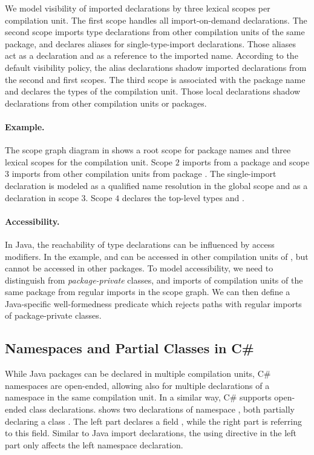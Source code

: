 We model visibility of imported declarations by three lexical scopes per compilation unit.
The first scope handles all import-on-demand declarations.
The second scope 
  imports type declarations from other compilation units of the same package,
  and declares aliases for single-type-import declarations.
Those aliases act as a declaration and as a reference to the imported name.
According to the default visibility policy, 
  the alias declarations shadow imported declarations from the second and first scopes.
The third scope is associated with the package name and 
  declares the types of the compilation unit.
Those local declarations shadow declarations from other compilation units or packages.

\paragraph{Example.}

The scope graph diagram in  shows 
  a root scope for package names and three lexical scopes for the compilation unit.
Scope $2$ imports from a package 
  and scope $3$ imports from other compilation units from package .
The single-import declaration  is modeled as a qualified name resolution in the global scope
  and as a declaration in scope $3$.
Scope $4$ declares the top-level types  and .

\paragraph{Accessibility.}

In Java, the reachability of type declarations can be influenced by access modifiers.
In the example,  and  can be accessed in other compilation units of ,
  but  cannot be accessed in other packages.
To model accessibility, we need to distinguish 
    from \emph{package-private} classes, and
  imports of compilation units of the same package from regular imports in the scope graph.
We can then define a Java-specific well-formedness predicate which rejects
  paths with regular imports of package-private classes.

\subsection{Namespaces and Partial Classes in C\#}

While Java packages can be declared in multiple compilation units,
  C\# namespaces are open-ended,
  allowing also for multiple declarations of a namespace in the same compilation unit.
In a similar way, C\# supports open-ended class declarations.
 shows two declarations of namespace , 
  both partially declaring a class .
The left part declares a field ,
  while the right part is referring to this field.
Similar to Java import declarations, 
  the using directive in the left part only affects the left namespace declaration. 
  
